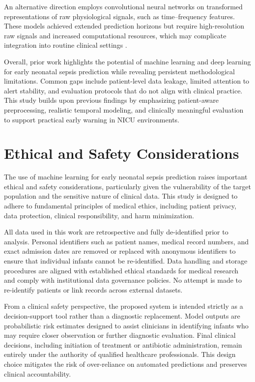 An alternative direction employs convolutional neural networks on transformed representations of raw physiological signals, such as time–frequency features. These models achieved extended prediction horizons but require high-resolution raw signals and increased computational resources, which may complicate integration into routine clinical settings \cite{cnn_psd_sepsis}.

Overall, prior work highlights the potential of machine learning and deep learning for early neonatal sepsis prediction while revealing persistent methodological limitations. Common gaps include patient-level data leakage, limited attention to alert stability, and evaluation protocols that do not align with clinical practice. This study builds upon previous findings by emphasizing patient-aware preprocessing, realistic temporal modeling, and clinically meaningful evaluation to support practical early warning in NICU environments.

\section{Ethical and Safety Considerations}

The use of machine learning for early neonatal sepsis prediction raises important ethical and safety considerations, particularly given the vulnerability of the target population and the sensitive nature of clinical data. This study is designed to adhere to fundamental principles of medical ethics, including patient privacy, data protection, clinical responsibility, and harm minimization.

All data used in this work are retrospective and fully de-identified prior to analysis. Personal identifiers such as patient names, medical record numbers, and exact admission dates are removed or replaced with anonymous identifiers to ensure that individual infants cannot be re-identified. Data handling and storage procedures are aligned with established ethical standards for medical research and comply with institutional data governance policies. No attempt is made to re-identify patients or link records across external datasets.

From a clinical safety perspective, the proposed system is intended strictly as a decision-support tool rather than a diagnostic replacement. Model outputs are probabilistic risk estimates designed to assist clinicians in identifying infants who may require closer observation or further diagnostic evaluation. Final clinical decisions, including initiation of treatment or antibiotic administration, remain entirely under the authority of qualified healthcare professionals. This design choice mitigates the risk of over-reliance on automated predictions and preserves clinical accountability.


